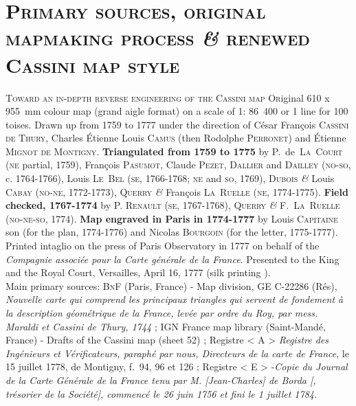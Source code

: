 \documentclass[portrait,a0]{sciposter}
\begin{document}
\begin{minipage}[b]{\textwidth}
  \section{\normalfont \textsc{Primary sources, original mapmaking process \textit{\&} renewed Cassini map style}}
  \begin{multicols}{3}
    \setlength{\columnsep}{80pt}
    \textsc{Toward an in-depth reverse engineering of the Cassini map}
    \vfill
    \normalsize
    \lettrine{O}riginal 610 x 955~mm colour map (\og grand aigle \fg format) on a scale of 1: 86~400 or 1 line for 100 toises. Drawn up from 1759 to 1777 under the direction of César François \textsc{Cassini de Thury}, Charles Étienne Louis \textsc{Camus} (then Rodolphe \textsc{Perronet}) and Étienne \textsc{Mignot de Montigny}. \textbf{Triangulated from 1759 to 1775} by P.~de~\textsc{La~Court} (\textsc{ne} partial, 1759), François \textsc{Pasumot}, Claude \textsc{Pezet}, \textsc{Dallier} and \textsc{Dailley} (\textsc{no-so}, c. 1764-1766), Louis \textsc{Le~Bel} (\textsc{se}, 1766-1768; \textsc{ne} and \textsc{so}, 1769), \textsc{Dubois} \textit{\&} Louis \textsc{Cabay} (\textsc{no-ne}, 1772-1773), Q\textsc{uerry} \textit{\&} François \textsc{La~Ruelle} (\textsc{ne}, 1774-1775). \textbf{Field checked, 1767-1774} by P. \textsc{Renault} (\textsc{se}, 1767-1768), Q\textsc{uerry} \textit{\&} F.~\textsc{La~Ruelle} (\textsc{no-ne-so}, 1774). \textbf{Map engraved in Paris in 1774-1777} by Louis \textsc{Capitaine} son (for the plan, 1774-1776) and Nicolas \textsc{Bourgoin} (for the letter, 1775-1777). Printed intaglio on the press of Paris Observatory in 1777 on behalf of the \textit{Compagnie associée pour la Carte générale de la France}. Presented to the King and the Royal Court, Versailles, April 16, 1777 (\og silk printing \fg).\\
    \vfill
    \scriptsize Main primary sources: \textsc{BnF} (Paris, France) - Map division, GE C-22286 (Rés), \textit{Nouvelle carte qui comprend les principaux triangles qui servent de fondement à la description géométrique de la France, levée par ordre du Roy, par mess. Maraldi et Cassini de Thury, 1744} ; IGN France map library (Saint-Mandé, France) - Drafts of the Cassini map (sheet 52) ; Registre < A > \textit{Registre des Ingénieurs et Vérificateurs, paraphé par nous, Directeurs de la carte de France}, le 15 juillet 1778, de Montigny, f.~94, 96 et 126 ; Registre  < E > -\textit{Copie du Journal de la Carte Générale de la France tenu par M. [Jean-Charles] de Borda [, trésorier de la Société], commencé le 26 juin 1756 et fini le 1 juillet 1784.}

\end{multicols}
\end{minipage}
\end{document}
